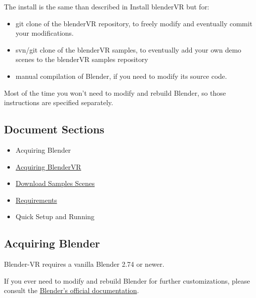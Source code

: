 \documentclass[a4,10pt,openany,oneside]{sphinxmanual}
\begin{document}
The install is the same than described in Install blenderVR but for:
\begin{itemize}
\item {} 
git clone of the blenderVR repository, to freely modify and eventually commit your modifications.

\item {} 
svn/git clone of the blenderVR samples, to eventually add your own demo scenes to the blenderVR samples repository

\item {} 
manual compilation of Blender, if you need to modify its source code.

\end{itemize}

Most of the time you won't need to modify and rebuild Blender, so those instructions are specified separately.


\subsection{Document Sections}
\label{installation/development:document-sections}\begin{itemize}
\item {} 
Acquiring Blender

\item {} 
{\hyperref[installation/development:acquiring-blendervr]{Acquiring BlenderVR}}

\item {} 
{\hyperref[installation/development:download-samples-scenes]{Download Samples Scenes}}

\item {} 
{\hyperref[installation/development:id3]{Requirements}}

\item {} 
Quick Setup and Running

\end{itemize}


\subsection{Acquiring Blender}
\label{installation/development:acquiring-blender}
Blender-VR requires a vanilla Blender 2.74 or newer.

If you ever need to modify and rebuild Blender for further customizations, please consult the \href{http://wiki.blender.org/index.php/Dev:Doc/Building\_Blender}{Blender's official documentation}.
\end{document}
